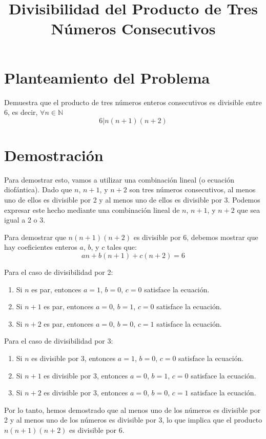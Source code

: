 \documentclass{article}
\begin{document}
\title{Divisibilidad del Producto de Tres Números Consecutivos}
\maketitle

\section*{Planteamiento del Problema}
Demuestra que el producto de tres números enteros consecutivos es divisible entre 6, es decir, \(\forall n \in \mathbb{N}\) 
\[ 6|n(n + 1)(n + 2) \]

\section*{Demostración}

Para demostrar esto, vamos a utilizar una combinación lineal (o ecuación diofántica). Dado que \( n \), \( n+1 \), y \( n+2 \) son tres números consecutivos, al menos uno de ellos es divisible por 2 y al menos uno de ellos es divisible por 3. Podemos expresar este hecho mediante una combinación lineal de \( n \), \( n+1 \), y \( n+2 \) que sea igual a 2 o 3.

Para demostrar que \( n(n+1)(n+2) \) es divisible por 6, debemos mostrar que hay coeficientes enteros \( a \), \( b \), y \( c \) tales que:
\[ an + b(n+1) + c(n+2) = 6 \]

Para el caso de divisibilidad por 2:
\begin{enumerate}
    \item Si \( n \) es par, entonces \( a = 1 \), \( b = 0 \), \( c = 0 \) satisface la ecuación.
    \item Si \( n+1 \) es par, entonces \( a = 0 \), \( b = 1 \), \( c = 0 \) satisface la ecuación.
    \item Si \( n+2 \) es par, entonces \( a = 0 \), \( b = 0 \), \( c = 1 \) satisface la ecuación.
\end{enumerate}

Para el caso de divisibilidad por 3:
\begin{enumerate}
    \item Si \( n \) es divisible por 3, entonces \( a = 1 \), \( b = 0 \), \( c = 0 \) satisface la ecuación.
    \item Si \( n+1 \) es divisible por 3, entonces \( a = 0 \), \( b = 1 \), \( c = 0 \) satisface la ecuación.
    \item Si \( n+2 \) es divisible por 3, entonces \( a = 0 \), \( b = 0 \), \( c = 1 \) satisface la ecuación.
\end{enumerate}

Por lo tanto, hemos demostrado que al menos uno de los números es divisible por 2 y al menos uno de los números es divisible por 3, lo que implica que el producto \( n(n+1)(n+2) \) es divisible por 6.
\end{document}

